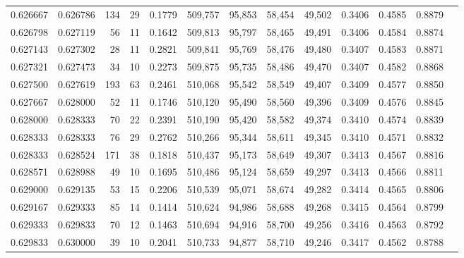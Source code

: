 \begin{tabular}{rrrrrrrrrrrrr}
0.626667 & 0.626786 &   134 &  29 &                                     0.1779 & 509,757 &  95,853 &  58,454 &  49,502 & 0.3406 & 0.4585 & 0.8879 \\
0.626798 & 0.627119 &    56 &  11 &                                     0.1642 & 509,813 &  95,797 &  58,465 &  49,491 & 0.3406 & 0.4584 & 0.8874 \\
0.627143 & 0.627302 &    28 &  11 &                                     0.2821 & 509,841 &  95,769 &  58,476 &  49,480 & 0.3407 & 0.4583 & 0.8871 \\
0.627321 & 0.627473 &    34 &  10 &                                     0.2273 & 509,875 &  95,735 &  58,486 &  49,470 & 0.3407 & 0.4582 & 0.8868 \\
0.627500 & 0.627619 &   193 &  63 &                                     0.2461 & 510,068 &  95,542 &  58,549 &  49,407 & 0.3409 & 0.4577 & 0.8850 \\
0.627667 & 0.628000 &    52 &  11 &                                     0.1746 & 510,120 &  95,490 &  58,560 &  49,396 & 0.3409 & 0.4576 & 0.8845 \\
0.628000 & 0.628333 &    70 &  22 &                                     0.2391 & 510,190 &  95,420 &  58,582 &  49,374 & 0.3410 & 0.4574 & 0.8839 \\
0.628333 & 0.628333 &    76 &  29 &                                     0.2762 & 510,266 &  95,344 &  58,611 &  49,345 & 0.3410 & 0.4571 & 0.8832 \\
0.628333 & 0.628524 &   171 &  38 &                                     0.1818 & 510,437 &  95,173 &  58,649 &  49,307 & 0.3413 & 0.4567 & 0.8816 \\
0.628571 & 0.628988 &    49 &  10 &                                     0.1695 & 510,486 &  95,124 &  58,659 &  49,297 & 0.3413 & 0.4566 & 0.8811 \\
0.629000 & 0.629135 &    53 &  15 &                                     0.2206 & 510,539 &  95,071 &  58,674 &  49,282 & 0.3414 & 0.4565 & 0.8806 \\
0.629167 & 0.629333 &    85 &  14 &                                     0.1414 & 510,624 &  94,986 &  58,688 &  49,268 & 0.3415 & 0.4564 & 0.8799 \\
0.629333 & 0.629833 &    70 &  12 &                                     0.1463 & 510,694 &  94,916 &  58,700 &  49,256 & 0.3416 & 0.4563 & 0.8792 \\
0.629833 & 0.630000 &    39 &  10 &                                     0.2041 & 510,733 &  94,877 &  58,710 &  49,246 & 0.3417 & 0.4562 & 0.8788 \\

\end{tabular}
